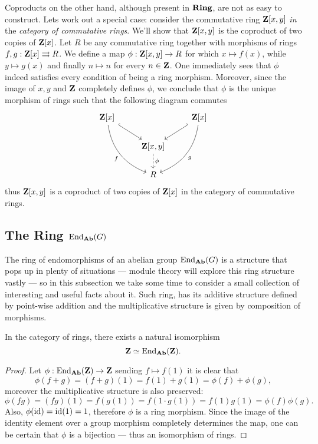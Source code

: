 \begin{remark}
\label{rem:coproduct-Z[x,y]}
Coproducts on the other hand, although present in \({\textbf{Ring}}\), are not as easy to
construct. Lets work out a special case: consider the commutative ring
\(\mathbf{Z}[x, y]\) \emph{in} the \emph{category of commutative rings}. We'll show that
\(\mathbf{Z}[x, y]\) is the coproduct of two copies of \(\mathbf{Z}[x]\). Let \(R\) be any
commutative ring together with morphisms of rings \(f, g: \mathbf{Z}[x]
\rightrightarrows R\). We define a map \(\phi: \mathbf{Z}[x, y] \to R\) for which \(x
\mapsto f(x)\), while \(y \mapsto g(x)\) and finally \(n \mapsto n\) for every
\(n \in \mathbf{Z}\). One immediately sees that \(\phi\) indeed satisfies every
condition of being a ring morphism. Moreover, since the image of \(x, y\) and
\(\mathbf{Z}\) completely defines \(\phi\), we conclude that \(\phi\) is the unique
morphism of rings such that the following diagram commutes
\[
\begin{tikzcd}
\Z[x] \ar[dr, hook] \ar[rdd, bend right, swap, "f"]
& &\Z[x] \ar[dl, hook'] \ar[dld, bend left, "g"] \\
&\Z[x, y] \ar[d, dashed, "\phi"] & \\
&R &
\end{tikzcd}
\]
thus \(\mathbf{Z}[x, y]\) is a coproduct of two copies of \(\mathbf{Z}[x]\) in the category of
commutative rings.
\end{remark}

\subsection{The Ring \texorpdfstring{\(\operatorname{End}_{{\textbf{Ab}}}(G)\)}{End\_Ab(G)}}

The ring of endomorphisms of an abelian group \(\operatorname{End}_{{\textbf{Ab}}}(G)\) is a structure
that pops up in plenty of situations --- module theory will explore this ring
structure vastly --- so in this subsection we take some time to consider a small
collection of interesting and useful facts about it. Such ring, has its additive
structure defined by point-wise addition and the multiplicative structure is
given by composition of morphisms.

%
\begin{proposition}
\label{prop:Z-isomorphic-End(Z)-in-Ring}
In the category of rings, there exists a natural isomorphism
\[
\mathbf{Z} \simeq \operatorname{End}_{{\textbf{Ab}}}(\mathbf{Z}).
\]
\end{proposition}
%

%
\begin{proof}
Let \(\phi: \operatorname{End}_{{\textbf{Ab}}}(\mathbf{Z}) \to \mathbf{Z}\) sending \(f \mapsto f(1)\) it is clear that
\[
\phi(f + g) = (f + g)(1) = f(1) + g(1) = \phi(f) + \phi(g),
\]
moreover the multiplicative structure is also preserved:
\[
\phi(f g) = (f g)(1) = f(g(1)) = f(1 \cdot g(1)) = f(1) g(1) = \phi(f) \phi(g).
\]
Also, \(\phi(\operatorname{id}) = \operatorname{id}(1) = 1\), therefore \(\phi\) is a ring morphism. Since
the image of the identity element over a group morphism completely determines
the map, one can be certain that \(\phi\) is a bijection --- thus an isomorphism
of rings.
\end{proof}
%

